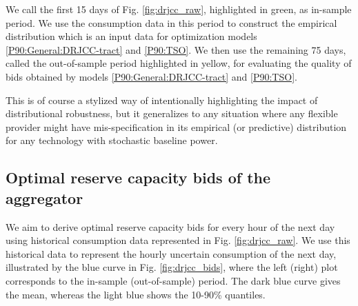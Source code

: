 \documentclass[conference]{IEEEtran}
\begin{document}
We call the first 15 days of Fig. \ref{fig:drjcc_raw}, highlighted in green, as in-sample period. We use the consumption data in this period to construct the empirical distribution which is an input data for optimization models \eqref{P90:General:DRJCC-tract} and \eqref{P90:TSO}. We then use the remaining 75 days, called the out-of-sample period highlighted in yellow, for evaluating the quality of bids obtained by models \eqref{P90:General:DRJCC-tract} and \eqref{P90:TSO}. 



This is of course a stylized way of intentionally highlighting the impact of distributional robustness, but it generalizes to any situation where any flexible provider might have mis-specification in its empirical (or predictive) distribution for any technology with stochastic baseline power.


 
\vspace{2mm}
\subsection{Optimal reserve capacity bids of the aggregator}
\vspace{-1mm}
We aim to derive optimal reserve capacity bids for every hour of the next day using historical consumption data represented in Fig. \ref{fig:drjcc_raw}. We use this historical data to represent the hourly uncertain consumption of the next day, illustrated by the blue curve in Fig. \ref{fig:drjcc_bids}, where the left (right) plot corresponds to the in-sample (out-of-sample) period. The dark blue curve gives the mean, whereas the light blue shows the 10-90\% quantiles. 
\end{document}
